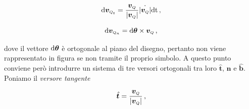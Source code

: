 \begin{equation}
{\rm d}{\bm v}_{\scriptscriptstyle{Q}_{\scriptscriptstyle{t}}}=
{{\bm v}_{\scriptscriptstyle{Q}}\over{
|{\bm v}_{\scriptscriptstyle{Q}}|}}
\dot{|{\bm v}_{\scriptscriptstyle{Q}}|}{\rm dt}\,,
	\label{e117}
\end{equation}

\begin{equation}
{\rm d}{\bm v}_{\scriptscriptstyle{Q}_{\scriptscriptstyle{n}}}=
 {\rm d}{\bm \theta}\times 
{\bm v}_{\scriptscriptstyle{Q}}\,, 
	\label{e118}
\end{equation}


\noindent dove il vettore ${\rm d}{\bm \theta}$ \`e
ortogonale al piano del disegno, pertanto non viene rappresentato in figura se non tramite il proprio simbolo.
A questo punto conviene per\`o introdurre un sistema di
tre versori ortogonali tra loro $\hat{\bm t}$, $\hat{\bm n}$ e $\hat{\bm b}$.
Poniamo il {\em versore tangente}

\begin{equation}
 \hat{\bm t}= {{{\bm v}_{\scriptscriptstyle{Q}}\over{
|{\bm v}_{\scriptscriptstyle{Q}}|}}}\,,
\label{e119}
\end{equation}

